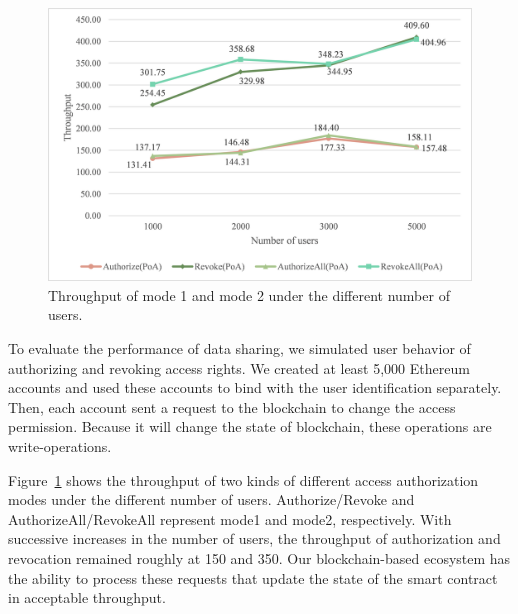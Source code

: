 \begin{figure}[htb]
    \centering
    \includegraphics[height=!,width=1\linewidth,keepaspectratio=true]{figures/authorize_comparsion.png}
    \caption{{\footnotesize Throughput of mode 1 and mode 2 under the different number of users.}}
    \label{fig:authorize_compare}
\end{figure}
To evaluate the performance of data sharing, we simulated user behavior of authorizing and revoking access rights. We created at least 5,000 Ethereum accounts and used these accounts to bind with the user identification separately. Then, each account sent a request to the blockchain to change the access permission. Because it will change the state of blockchain, these operations are write-operations.
\par

Figure~\ref{fig:authorize_compare} shows the throughput of two kinds of different access authorization modes under the different number of users. Authorize/Revoke and AuthorizeAll/RevokeAll represent mode1 and mode2, respectively. With successive increases in the number of users, the throughput of authorization and revocation remained roughly at 150 and 350. Our blockchain-based ecosystem has the ability to process these requests that update the state of the smart contract in acceptable throughput.

\newpage

